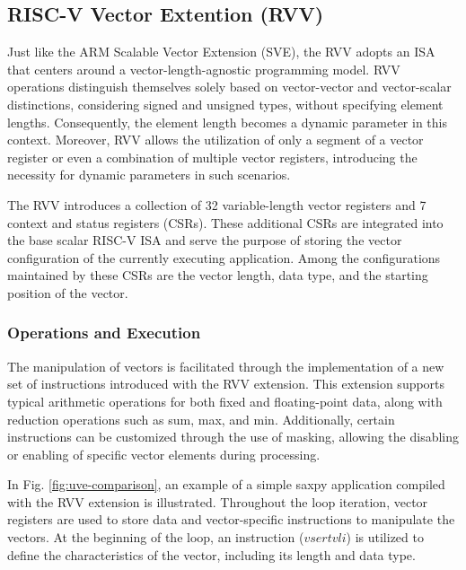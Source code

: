 \subsection{RISC-V Vector Extention (RVV)}
\label{label:rvv}

Just like the ARM Scalable Vector Extension (SVE), the \acrfull{RVV} adopts an \acrfull{ISA} that centers around a vector-length-agnostic programming model. \acrshort{RVV} operations distinguish themselves solely based on vector-vector and vector-scalar distinctions, considering signed and unsigned types, without specifying element lengths. Consequently, the element length becomes a dynamic parameter in this context. Moreover, \acrshort{RVV} allows the utilization of only a segment of a vector register or even a combination of multiple vector registers, introducing the necessity for dynamic parameters in such scenarios.


The \acrlong{RVV} introduces a collection of 32 variable-length vector registers and 7 context and status registers (CSRs). These additional CSRs are integrated into the base scalar RISC-V ISA and serve the purpose of storing the vector configuration of the currently executing application. Among the configurations maintained by these CSRs are the vector length, data type, and the starting position of the vector.

\subsubsection{Operations and Execution}

The manipulation of vectors is facilitated through the implementation of a new set of instructions introduced with the \acrshort{RVV} extension. This extension supports typical arithmetic operations for both fixed and floating-point data, along with reduction operations such as sum, max, and min. Additionally, certain instructions can be customized through the use of masking, allowing the disabling or enabling of specific vector elements during processing.

In Fig. \ref{fig:uve-comparison}, an example of a simple saxpy application compiled with the RVV extension is illustrated. Throughout the loop iteration, vector registers are used to store data and vector-specific instructions to manipulate the vectors. At the beginning of the loop, an instruction ($vsertvli$) is utilized to define the characteristics of the vector, including its length and data type.






